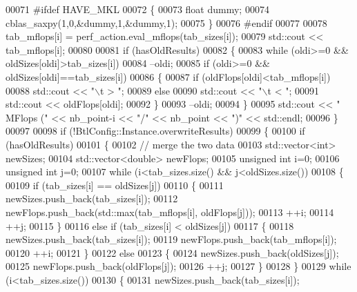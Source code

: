 \begin{DoxyCode}
00071 \textcolor{preprocessor}{    #ifdef HAVE\_MKL}
00072     \{
00073       \textcolor{keywordtype}{float} dummy;
00074       cblas\_saxpy(1,0,&dummy,1,&dummy,1);
00075     \}
00076 \textcolor{preprocessor}{    #endif}
00077 
00078     tab\_mflops[i] = perf\_action.eval\_mflops(tab\_sizes[i]);
00079     std::cout << tab\_mflops[i];
00080     
00081     \textcolor{keywordflow}{if} (hasOldResults)
00082     \{
00083       \textcolor{keywordflow}{while} (oldi>=0 && oldSizes[oldi]>tab\_sizes[i])
00084         --oldi;
00085       \textcolor{keywordflow}{if} (oldi>=0 && oldSizes[oldi]==tab\_sizes[i])
00086       \{
00087         \textcolor{keywordflow}{if} (oldFlops[oldi]<tab\_mflops[i])
00088           std::cout << \textcolor{stringliteral}{"\(\backslash\)t > "};
00089         \textcolor{keywordflow}{else}
00090           std::cout << \textcolor{stringliteral}{"\(\backslash\)t < "};
00091         std::cout << oldFlops[oldi];
00092       \}
00093       --oldi;
00094     \}
00095     std::cout << \textcolor{stringliteral}{" MFlops    ("} << nb\_point-i << \textcolor{stringliteral}{"/"} << nb\_point << \textcolor{stringliteral}{")"} << std::endl;
00096   \}
00097 
00098   \textcolor{keywordflow}{if} (!BtlConfig::Instance.overwriteResults)
00099   \{
00100     \textcolor{keywordflow}{if} (hasOldResults)
00101     \{
00102       \textcolor{comment}{// merge the two data}
00103       std::vector<int> newSizes;
00104       std::vector<double> newFlops;
00105       \textcolor{keywordtype}{unsigned} \textcolor{keywordtype}{int} i=0;
00106       \textcolor{keywordtype}{unsigned} \textcolor{keywordtype}{int} j=0;
00107       \textcolor{keywordflow}{while} (i<tab\_sizes.size() && j<oldSizes.size())
00108       \{
00109         \textcolor{keywordflow}{if} (tab\_sizes[i] == oldSizes[j])
00110         \{
00111           newSizes.push\_back(tab\_sizes[i]);
00112           newFlops.push\_back(std::max(tab\_mflops[i], oldFlops[j]));
00113           ++i;
00114           ++j;
00115         \}
00116         \textcolor{keywordflow}{else} \textcolor{keywordflow}{if} (tab\_sizes[i] < oldSizes[j])
00117         \{
00118           newSizes.push\_back(tab\_sizes[i]);
00119           newFlops.push\_back(tab\_mflops[i]);
00120           ++i;
00121         \}
00122         \textcolor{keywordflow}{else}
00123         \{
00124           newSizes.push\_back(oldSizes[j]);
00125           newFlops.push\_back(oldFlops[j]);
00126           ++j;
00127         \}
00128       \}
00129       \textcolor{keywordflow}{while} (i<tab\_sizes.size())
00130       \{
00131         newSizes.push\_back(tab\_sizes[i]);

\end{DoxyCode}
